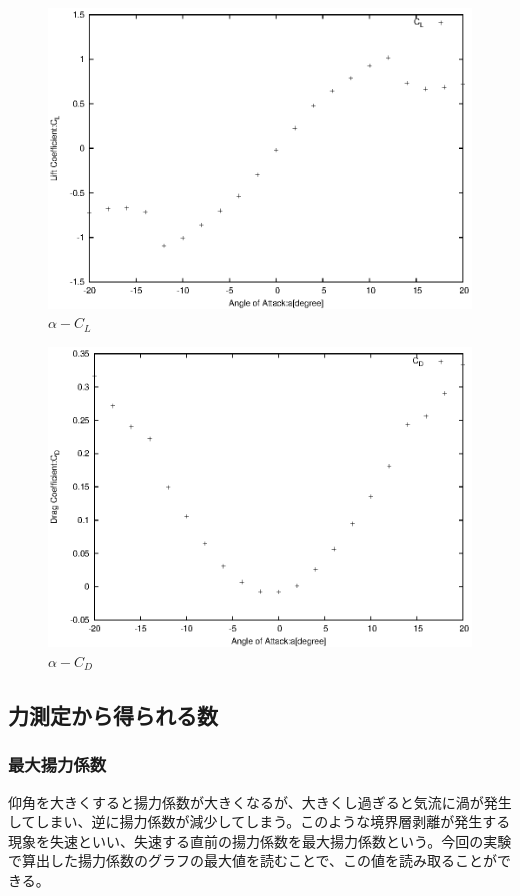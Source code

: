 \documentclass[a4j,twoside,openright,11pt]{jarticle}
\begin{document}
\begin{figure}[htbp]
\begin{center}
\includegraphics[width=12cm]{./2-CL-CD/CL-CD.eps}
\end{center}
\caption{$\alpha-C_L$}
\end{figure}

\begin{figure}[htb]
\begin{center}
\includegraphics[width=12cm]{./2-CL-CD/CD.eps}
\end{center}
\caption{$\alpha-C_D$}
\end{figure}


\newpage
\subsection{力測定から得られる数}
\subsubsection{最大揚力係数}
仰角を大きくすると揚力係数が大きくなるが、大きくし過ぎると気流に渦が発生してしまい、逆に揚力係数が減少してしまう。このような境界層剥離が発生する現象を失速といい、失速する直前の揚力係数を最大揚力係数という。今回の実験で算出した揚力係数のグラフの最大値を読むことで、この値を読み取ることができる。
\end{document}
